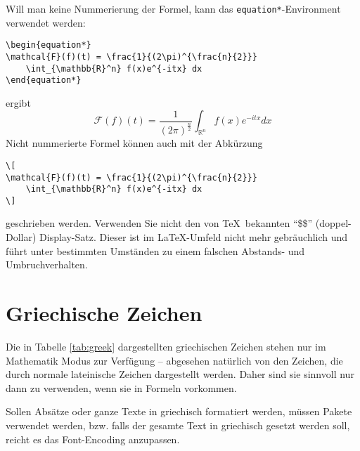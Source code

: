 Will man keine Nummerierung der Formel, kann das \texttt{equation*}-En\-vi\-ron\-ment verwendet werden:
\begin{verbatim}
\begin{equation*}
\mathcal{F}(f)(t) = \frac{1}{(2\pi)^{\frac{n}{2}}} 
	\int_{\mathbb{R}^n} f(x)e^{-itx} dx
\end{equation*}
\end{verbatim}
ergibt
\begin{equation*}
\mathcal{F}(f)(t) = \frac{1}{(2\pi)^{\frac{n}{2}}} 
	\int_{\mathbb{R}^n} f(x)e^{-itx} dx
\end{equation*}
Nicht nummerierte Formel können auch mit der Abkürzung
\begin{verbatim}
\[
\mathcal{F}(f)(t) = \frac{1}{(2\pi)^{\frac{n}{2}}} 
	\int_{\mathbb{R}^n} f(x)e^{-itx} dx
\]
\end{verbatim}
geschrieben werden. Verwenden Sie nicht den von \TeX\ bekannten "`\$\$"' (doppel-Dollar) Display-Satz. Dieser ist im \LaTeX-Umfeld nicht mehr gebräuchlich und führt unter bestimmten Umständen zu einem falschen Abstands- und Umbruchverhalten.

\section{Griechische Zeichen}

Die in Tabelle \ref{tab:greek} dargestellten griechischen Zeichen stehen nur im Mathematik Modus zur Verfügung -- abgesehen natürlich von den Zeichen, die durch normale lateinische Zeichen dargestellt werden. Daher sind sie sinnvoll nur dann zu verwenden, wenn sie in Formeln vorkommen. 

Sollen Absätze oder ganze Texte in griechisch formatiert werden, müssen Pakete verwendet werden, bzw. falls der gesamte Text in griechisch gesetzt werden soll, reicht es das Font-Encoding anzupassen.

